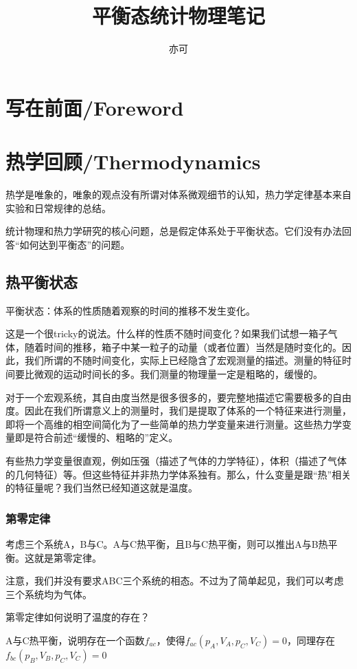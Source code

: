 \documentclass[a4paper, 10pt, openany]{book}%
\begin{document}
  \title{ \heiti 平衡态统计物理笔记}
  \author{亦可}
  \maketitle
  \tableofcontents


  \newpage

  \chapter{写在前面/Foreword}
  \chapter{热学回顾/Thermodynamics}

  热学是唯象的，唯象的观点没有所谓对体系微观细节的认知，热力学定律基本来自实验和日常规律的总结。

  统计物理和热力学研究的核心问题，总是假定体系处于平衡状态。它们没有办法回答“如何达到平衡态”的问题。

\section{热平衡状态}
平衡状态：体系的性质随着观察的时间的推移不发生变化。

这是一个很tricky的说法。什么样的性质不随时间变化？如果我们试想一箱子气体，随着时间的推移，箱子中某一粒子的动量（或者位置）当然是随时变化的。因此，我们所谓的不随时间变化，实际上已经隐含了宏观测量的描述。测量的特征时间要比微观的运动时间长的多。我们测量的物理量一定是粗略的，缓慢的。

对于一个宏观系统，其自由度当然是很多很多的，要完整地描述它需要极多的自由度。因此在我们所谓意义上的测量时，我们是提取了体系的一个特征来进行测量，即将一个高维的相空间简化为了一些简单的热力学变量来进行测量。这些热力学变量即是符合前述“缓慢的、粗略的”定义。

有些热力学变量很直观，例如压强（描述了气体的力学特征），体积（描述了气体的几何特征）等。但这些特征并非热力学体系独有。那么，什么变量是跟“热”相关的特征量呢？我们当然已经知道这就是温度。

\subsection{第零定律}

考虑三个系统A，B与C。A与C热平衡，且B与C热平衡，则可以推出A与B热平衡。这就是第零定律。

注意，我们并没有要求ABC三个系统的相态。不过为了简单起见，我们可以考虑三个系统均为气体。

第零定律如何说明了温度的存在？

A与C热平衡，说明存在一个函数$f_{ac}$，使得$f_{ac}(p_A,V_A,p_C,V_C)=0$，同理存在$f_{bc}(p_B,V_B,p_C,V_C)=0$
\end{document}
